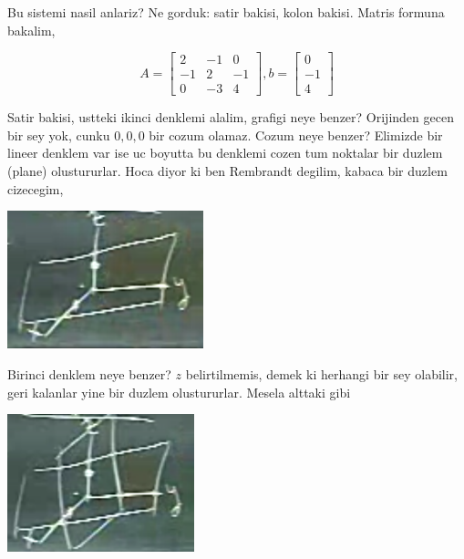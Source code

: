 \documentclass[12pt,fleqn]{article}\usepackage{../common}
\begin{document}
Bu sistemi nasil anlariz? Ne gorduk: satir bakisi, kolon bakisi. Matris
formuna bakalim, 

$$ A = 
\left[\begin{array}{rrr}
2 & -1 & 0 \\
-1 & 2 & -1 \\
0 & -3 & 4 
\end{array}\right]
,
b = 
\left[\begin{array}{r}
0  \\
-1 \\
4  
\end{array}\right]
 $$

Satir bakisi, ustteki ikinci denklemi alalim, grafigi neye benzer?
Orijinden gecen bir sey yok, cunku $0,0,0$ bir cozum olamaz. Cozum neye
benzer? Elimizde bir lineer denklem var ise uc boyutta bu denklemi cozen
tum noktalar bir duzlem (plane) olustururlar. Hoca diyor ki ben Rembrandt
degilim, kabaca bir duzlem cizecegim, 

\includegraphics[height=4cm]{1_06.png}

Birinci denklem neye benzer? $z$ belirtilmemis, demek ki herhangi bir sey
olabilir, geri kalanlar yine bir duzlem olustururlar. Mesela alttaki gibi

\includegraphics[height=4cm]{1_07.png}
\end{document}

